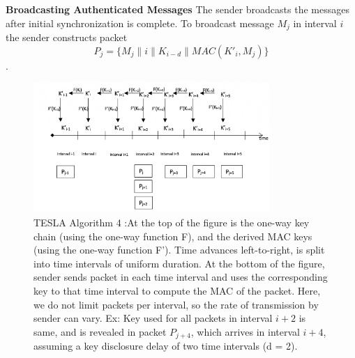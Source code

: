 \textbf{Broadcasting Authenticated Messages}
The sender broadcasts the messages after initial synchronization is complete.
To broadcast message $M_{j}$ in interval $i$ the sender constructs packet \[P_{j} = \{M_{j} \|i\|  K_{i-d}\|MAC(K'_{i} , M_{j} ) \}\].





% 
\begin{figure}[H]
\centering
\includegraphics[width=0.8\textwidth]{figures/teslaAlgo4.png}
\caption{TESLA Algorithm 4 :At the top of the figure is the one-way key chain (using the one-way function F), and the derived MAC keys (using the one-way function F'). Time advances left-to-right, is split into time intervals of uniform duration. At the bottom of the figure, sender sends packet in each time interval and uses the corresponding key to that time interval to compute the MAC of the packet. Here, we do not limit packets per interval, so the rate of transmission by sender can vary. 
Ex: Key used for all packets in interval $i+2$ is same, and is revealed in packet $P_{j+4}$, which arrives in interval $i+4$, assuming a key disclosure delay of two time intervals (d = 2).}
\label{teslaAlgo4}
\end{figure}


